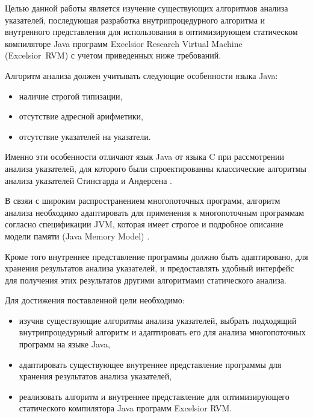 \documentclass[14pt,titlepage]{extarticle}
\newcommand{\eng}[1]{{\English#1}}
\begin{document}
    Целью данной работы является изучение существующих алгоритмов анализа
    указателей, последующая разработка внутрипроцедурного алгоритма и
    внутренного представления для использования в оптимизирующем
    статическом компиляторе Java программ
    \eng{Excelsior Research Virtual Machine (Excelsior~RVM)}
    \cite{excelsior_jet} с учетом приведенных ниже требований.

    Алгоритм анализа должен учитывать следующие особенности языка Java:
    \begin{itemize}
      \item наличие строгой типизации,
      \item отсутствие адресной арифметики,
      \item отсутствие указателей на указатели.
    \end{itemize}
    Именно эти особенности отличают язык Java от языка C при рассмотрении
    анализа указателей, для которого были
    спроектированны классические алгоритмы анализа указателей
    Стинсгарда \cite{steensgaard} и Андерсена \cite{andersen}.

    В свзяи с широким распространением многопоточных программ,
    алгоритм анализа необходимо адаптировать для применения к
    многопоточным программам согласно спецификации JVM, которая имеет
    строгое и подробное описание модели памяти (Java Memory Model)
    \cite{manson_jmm}.

    Кроме того внутреннее представление программы должно быть адаптировано,
    для хранения результатов анализа указателей, и предоставлять удобный
    интерфейс для получения этих результатов другими алгоритмами статического
    анализа.

    Для достижения поставленной цели необходимо:
    \begin{itemize}
      \item изучив существующие алгоритмы анализа указателей, выбрать
            подходящий внутрипроцедурный алгоритм и адаптировать его
            для анализа многопоточных программ на языке Java,
      \item адаптировать существующее внутреннее представление программы для
            хранения результатов анализа указателей,
      \item реализовать алгоритм и внутреннее представление для оптимизирующего
            статического компилятора Java программ \eng{Excelsior RVM}.
    \end{itemize}

\end{document}
